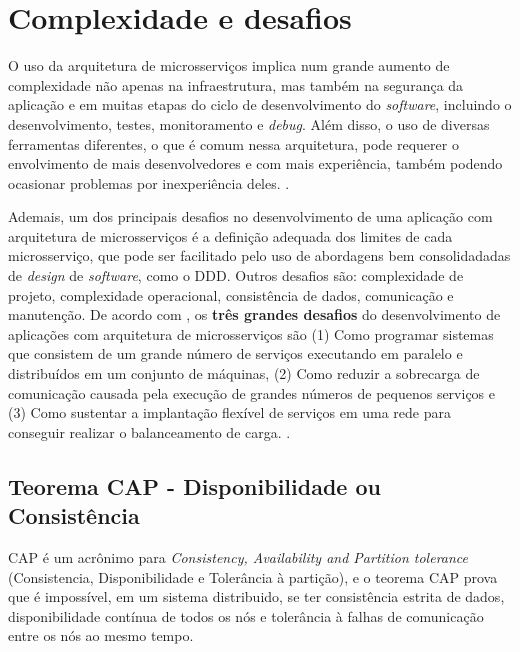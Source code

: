 
\section{Complexidade e desafios}

O uso da arquitetura de microsserviços implica num grande aumento de complexidade não apenas na infraestrutura, mas também na segurança da aplicação e em muitas etapas do ciclo de desenvolvimento do \emph{software}, incluindo o desenvolvimento, testes, monitoramento e \emph{debug}. Além disso, o uso de diversas ferramentas diferentes, o que é comum nessa arquitetura, pode requerer o envolvimento de mais desenvolvedores e com mais experiência, também podendo ocasionar problemas por inexperiência deles. \cite{top10-microservices-challenges,martin-fowler-microservice-tradeoffs,livro-building-microservices}.

Ademais, um dos principais desafios no desenvolvimento de uma aplicação com arquitetura de microsserviços é a definição adequada dos limites de cada microsserviço, que pode ser facilitado pelo uso de abordagens bem consolidadadas de \emph{design} de \emph{software}, como o DDD. Outros desafios são: complexidade de projeto, complexidade operacional, consistência de dados, comunicação e manutenção. De acordo com , os \textbf{três grandes desafios} do desenvolvimento de aplicações com arquitetura de microsserviços são (1) Como programar sistemas que consistem de um grande número de serviços executando em paralelo e distribuídos em um conjunto de máquinas, (2) Como reduzir a sobrecarga de comunicação causada pela execução de grandes números de pequenos serviços e (3) Como sustentar a implantação flexível de serviços em uma rede para conseguir realizar o balanceamento de carga. \cite{martin-fowler-monolith-first}.

\subsection*{Teorema CAP - Disponibilidade ou Consistência}\label{teorema-cap}
CAP é um acrônimo para \emph{Consistency, Availability and Partition tolerance} (Consistencia, Disponibilidade e Tolerância à partição), e o teorema CAP prova que é impossível, em um sistema distribuido, se ter consistência estrita de dados, disponibilidade contínua de todos os nós e tolerância à falhas de comunicação entre os nós ao mesmo tempo.


